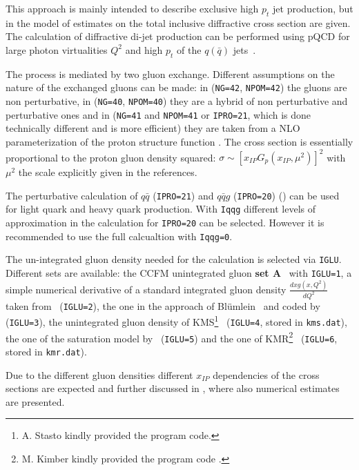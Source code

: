 \documentclass[10pt]{article} \usepackage{dina4}
\newcommand{\pom}{I\!\!P}
\newcommand{\xpom}{x_{\pom}}
\begin{document}
\begin{itemize}
This approach is mainly intended to describe exclusive high $p_t$
jet production, but in the model of \cite{Wusthoff} estimates on the
total inclusive diffractive cross section are given.
The calculation of diffractive di-jet production can be
performed using pQCD for large photon virtualities $Q^2$ and 
high $p_t$ of the 
$q (\bar{q})$ 
jets~\cite{Wusthoff,Diehl1,Diehl2,Bartels_dijet_ws,Bartels_jets,Bartels_asym}.
\par
The process is mediated by two gluon exchange. Different
assumptions on the nature of the exchanged gluons 
can be
made: in \cite{Diehl1,Diehl2} (\verb+NG=42+, \verb+NPOM=42+)
the gluons are non perturbative, in \cite{Wusthoff} 
(\verb+NG=40+, \verb+NPOM=40+) 
they are a hybrid of
non perturbative and perturbative ones and in 
\cite{Bartels_jets,Bartels_asym}
 (\verb+NG=41+ and \verb+NPOM=41+ or \verb+IPRO=21+,
which is done technically different and is more efficient) 
they are
taken from a NLO parameterization of the proton structure 
function \cite{GRVa,GRVb}.
The cross section is essentially proportional to the  proton gluon density 
squared: 
$\sigma \sim \left[\xpom G_p\left(\xpom,\mu^2 \right)\right]^2 $
with $\mu^2$ the scale explicitly given in the references.
\par
The perturbative calculation of $q\bar{q}$ (\verb+IPRO=21+) and 
$q\bar{q} g$ (\verb+IPRO=20+) 
(\cite{Bartels_jets,Bartels_qqga,Bartels_qqg-charm}) 
can be used for light quark and heavy
quark production. With \verb+Iqqg+ different levels of approximation 
in the calculation for \verb+IPRO=20+ can be selected. However it is recommended to use the 
full calcualtion with  \verb+Iqqg=0+.

The un-integrated gluon density needed for 
the calculation is
selected via \verb+IGLU+. Different sets are available:
 the CCFM unintegrated gluon {\bf set A}~\cite{jung-dis04}
with \verb+IGLU=1+,
a simple numerical derivative of a standard integrated gluon density
$\frac{d xg(x,Q^2)}{dQ^2}$ taken
from~\cite{GRV95}  (\verb+IGLU=2+), the one in the
approach 
of Bl\"umlein~\cite{Bluemlein} and coded 
by~\cite{baranov_zotov_1999,baranov_zotov_2000} (\verb+IGLU=3+),
the unintegrated gluon density of KMS\footnote{A. Stasto kindly
provided the program code.}~\cite{martin_stasto} 
(\verb+IGLU=4+, stored in \verb+kms.dat+), 
the one of the saturation model by~\cite{wuesthoff_golec-biernat}
 (\verb+IGLU=5+) and the one of KMR\footnote{M. Kimber kindly
provided the program code .}~\cite{martin_kimber} (\verb+IGLU=6+, 
stored in \verb+kmr.dat+).
\par
Due to the different gluon densities different $\xpom$ dependencies of
the cross sections are expected and further discussed in
\cite{Bartels_dijet_ws,Bartels_qqga,Bartels_qqg-charm}, 
where also numerical estimates are presented.


\end{itemize}
\end{document}
